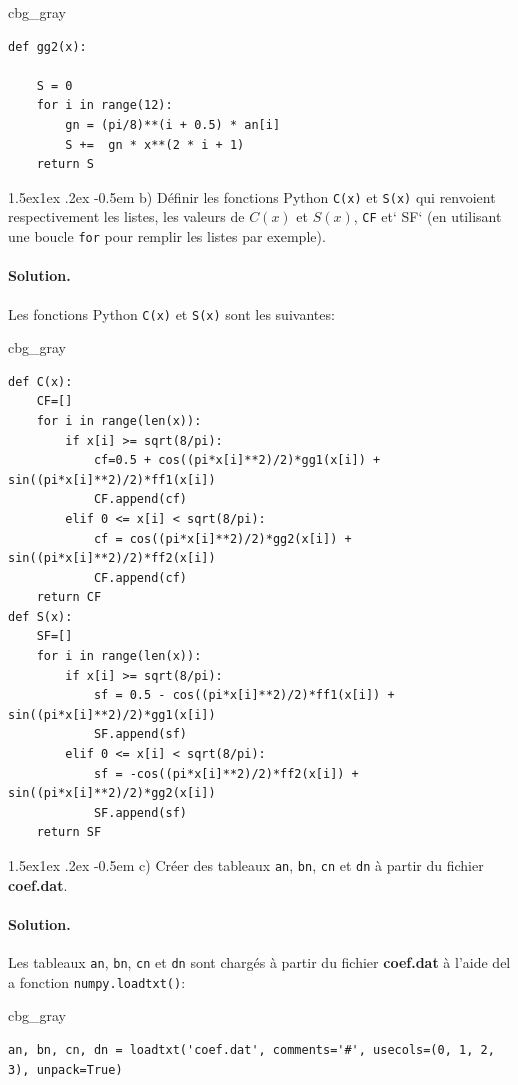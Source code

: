 \documentclass[%
oneside,                 %
final,                   %
10pt,french]{article}
\makeatletter
\newenvironment{_cod_tight}[1]{
   \def\FrameCommand{\colorbox{#1}}
   \FrameRule0.6pt\MakeFramed {\FrameRestore}\vskip3mm}
   {\vskip0mm\endMakeFramed}
\newenvironment{cod}[1]{
\bgroup\rmfamily
\fboxsep=0mm\relax
\begin{_cod_tight}{#1}
\list{}{\parsep=-2mm\parskip=0mm\topsep=0pt\leftmargin=2mm
\rightmargin=2\leftmargin\leftmargin=4pt\relax}
\item\relax}
{\endlist\end{_cod_tight}\egroup}
\newenvironment{doconceexercise}{}{}
\newcommand\subex{\@startsection{paragraph}{4}{\z@}%
                  {1.5ex\@plus1ex \@minus.2ex}%
                  {-0.5em}%
                  {\normalfont\normalsize\bfseries}}
\makeatother
\begin{document}
\begin{doconceexercise}
\begin{cod}{cbg_gray}
\begin{verbatim}
def gg2(x):

    S = 0
    for i in range(12):
        gn = (pi/8)**(i + 0.5) * an[i]
        S +=  gn * x**(2 * i + 1)
    return S
\end{verbatim}
\end{cod}
\noindent


\subex{b)}
Définir les fonctions Python \texttt{C(x)} et \texttt{S(x)} qui renvoient respectivement les listes, les valeurs de $C(x)$ et $S(x)$, \texttt{CF} et` SF` (en utilisant une boucle \texttt{for} pour remplir les listes par exemple).


\paragraph{Solution.}
Les fonctions Python \texttt{C(x)} et \texttt{S(x)} sont les suivantes:

\begin{cod}{cbg_gray}\begin{verbatim}
def C(x):
    CF=[]
    for i in range(len(x)):
        if x[i] >= sqrt(8/pi):
            cf=0.5 + cos((pi*x[i]**2)/2)*gg1(x[i]) + sin((pi*x[i]**2)/2)*ff1(x[i])
            CF.append(cf)
        elif 0 <= x[i] < sqrt(8/pi):
            cf = cos((pi*x[i]**2)/2)*gg2(x[i]) + sin((pi*x[i]**2)/2)*ff2(x[i])
            CF.append(cf)
    return CF
def S(x):
    SF=[]
    for i in range(len(x)):
        if x[i] >= sqrt(8/pi):
            sf = 0.5 - cos((pi*x[i]**2)/2)*ff1(x[i]) + sin((pi*x[i]**2)/2)*gg1(x[i])
            SF.append(sf)
        elif 0 <= x[i] < sqrt(8/pi):
            sf = -cos((pi*x[i]**2)/2)*ff2(x[i]) + sin((pi*x[i]**2)/2)*gg2(x[i])
            SF.append(sf)
    return SF
\end{verbatim}
\end{cod}
\noindent


\subex{c)}
Créer des tableaux \texttt{an}, \texttt{bn}, \texttt{cn} et \texttt{dn} à partir du fichier \textbf{coef.dat}.


\paragraph{Solution.}
Les tableaux \texttt{an}, \texttt{bn}, \texttt{cn} et \texttt{dn} sont chargés  à partir du fichier \textbf{coef.dat} à l'aide del a fonction \texttt{numpy.loadtxt()}:
\begin{cod}{cbg_gray}\begin{verbatim}
an, bn, cn, dn = loadtxt('coef.dat', comments='#', usecols=(0, 1, 2, 3), unpack=True)
\end{verbatim}
\end{cod}
\noindent


\end{doconceexercise}
\end{document}
